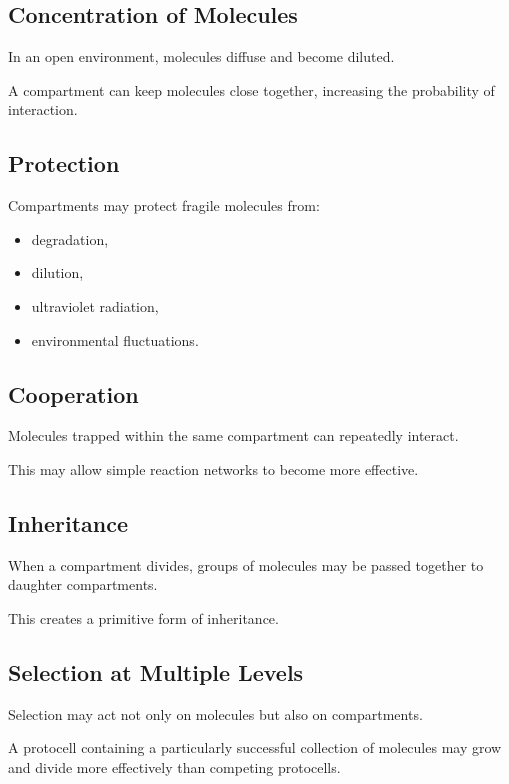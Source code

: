 \documentclass[
  oneside,
  openany]{book}
\providecommand{\tightlist}{%
  \setlength{\itemsep}{0pt}\setlength{\parskip}{0pt}}
\begin{document}
\subsection{Concentration of Molecules}\label{concentration-of-molecules}

In an open environment, molecules diffuse and become diluted.

A compartment can keep molecules close together, increasing the probability of interaction.

\subsection{Protection}\label{protection}

Compartments may protect fragile molecules from:

\begin{itemize}
\tightlist
\item
  degradation,
\item
  dilution,
\item
  ultraviolet radiation,
\item
  environmental fluctuations.
\end{itemize}

\subsection{Cooperation}\label{cooperation}

Molecules trapped within the same compartment can repeatedly interact.

This may allow simple reaction networks to become more effective.

\subsection{Inheritance}\label{inheritance}

When a compartment divides, groups of molecules may be passed together to daughter compartments.

This creates a primitive form of inheritance.

\subsection{Selection at Multiple Levels}\label{selection-at-multiple-levels}

Selection may act not only on molecules but also on compartments.

A protocell containing a particularly successful collection of molecules may grow and divide more effectively than competing protocells.
\end{document}

